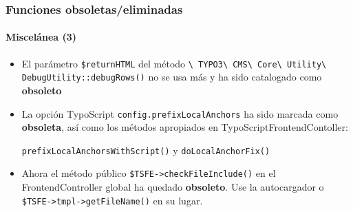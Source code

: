 \begin{frame}[fragile]
	\frametitle{Funciones obsoletas/eliminadas}
	\framesubtitle{Miscelánea (3)}

	\begin{itemize}

		\item El parámetro \texttt{\$returnHTML} del método 
			\small
				\texttt{\textbackslash
					TYPO3\textbackslash
					CMS\textbackslash
					Core\textbackslash
					Utility\textbackslash
					DebugUtility::debugRows()}
			\normalsize
			no se usa más y ha sido catalogado como \textbf{obsoleto}

		\item La opción TypoScript 
			\small\texttt{config.prefixLocalAnchors}\normalsize\space
			ha sido marcada como \textbf{obsoleta}, así como los
			métodos apropiados en TypoScriptFrontendContoller:

			\small\texttt{prefixLocalAnchorsWithScript()}\normalsize\space
			y
			\small\texttt{doLocalAnchorFix()}\normalsize

		\item Ahora el método público 
			\small\texttt{\$TSFE->checkFileInclude()}\normalsize\space
			en el FrontendController global ha quedado \textbf{obsoleto}.
			Use la autocargador o \texttt{\$TSFE->tmpl->getFileName()}
			en su lugar.

	\end{itemize}

\end{frame}


